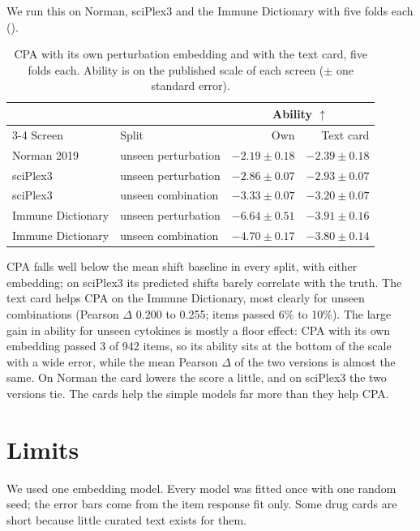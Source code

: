\documentclass[]{style}
\begin{document}
We run this on Norman, sciPlex3 and the Immune Dictionary with five folds each ().

\begin{table}[h]
\centering
\caption{CPA with its own perturbation embedding and with the text card, five folds each. Ability is on the published
scale of each screen ($\pm$ one standard error).}
\label{tab:cpa}
\small
\begin{tabular}{llrr}
\toprule
 & & \multicolumn{2}{c}{Ability $\uparrow$} \\
\cmidrule(lr){3-4}
Screen & Split & Own & Text card \\
\midrule
Norman 2019 & unseen perturbation & $-2.19\pm0.18$ & $-2.39\pm0.18$ \\
sciPlex3 & unseen perturbation & $-2.86\pm0.07$ & $-2.93\pm0.07$ \\
sciPlex3 & unseen combination & $-3.33\pm0.07$ & $-3.20\pm0.07$ \\
Immune Dictionary & unseen perturbation & $-6.64\pm0.51$ & $-3.91\pm0.16$ \\
Immune Dictionary & unseen combination & $-4.70\pm0.17$ & $-3.80\pm0.14$ \\
\bottomrule
\end{tabular}
\end{table}

CPA falls well below the mean shift baseline in every split, with either embedding; on sciPlex3 its predicted shifts
barely correlate with the truth. The text card helps CPA on the Immune Dictionary, most clearly for unseen
combinations (Pearson $\Delta$ 0.200 to 0.255; items passed 6\% to 10\%). The large gain in ability for unseen
cytokines is mostly a floor effect: CPA with its own embedding passed 3 of 942 items, so its ability sits at the bottom
of the scale with a wide error, while the mean Pearson $\Delta$ of the two versions is almost the same. On Norman the card
lowers the score a little, and on sciPlex3 the two versions tie. The cards help the simple models far more than they
help CPA.

\section{Limits}

We used one embedding model. Every model was fitted once with one random seed; the error bars come from the item
response fit only. Some drug cards are short because little curated text exists for them.

{\small


}
\end{document}
